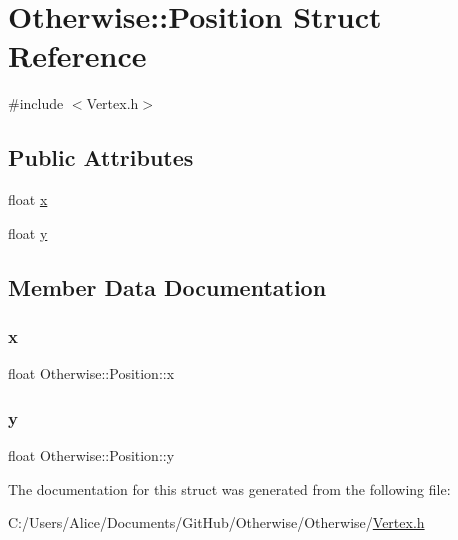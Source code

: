 \hypertarget{struct_otherwise_1_1_position}{}\section{Otherwise\+:\+:Position Struct Reference}
\label{struct_otherwise_1_1_position}


{\ttfamily \#include $<$Vertex.\+h$>$}

\subsection*{Public Attributes}
\begin{DoxyCompactItemize}
\item 
float \hyperlink{struct_otherwise_1_1_position_a726b9530b0077b058d20dd0b9039ce9e}{x}
\item 
float \hyperlink{struct_otherwise_1_1_position_a6836a39d902f7fc76c1035ce5abe253a}{y}
\end{DoxyCompactItemize}


\subsection{Member Data Documentation}
\mbox{\label{struct_otherwise_1_1_position_a726b9530b0077b058d20dd0b9039ce9e}} 
\subsubsection{\texorpdfstring{x}{x}}
{\footnotesize\ttfamily float Otherwise\+::\+Position\+::x}

\mbox{\label{struct_otherwise_1_1_position_a6836a39d902f7fc76c1035ce5abe253a}} 
\subsubsection{\texorpdfstring{y}{y}}
{\footnotesize\ttfamily float Otherwise\+::\+Position\+::y}



The documentation for this struct was generated from the following file\+:\begin{DoxyCompactItemize}
\item 
C\+:/\+Users/\+Alice/\+Documents/\+Git\+Hub/\+Otherwise/\+Otherwise/\hyperlink{_vertex_8h}{Vertex.\+h}\end{DoxyCompactItemize}
